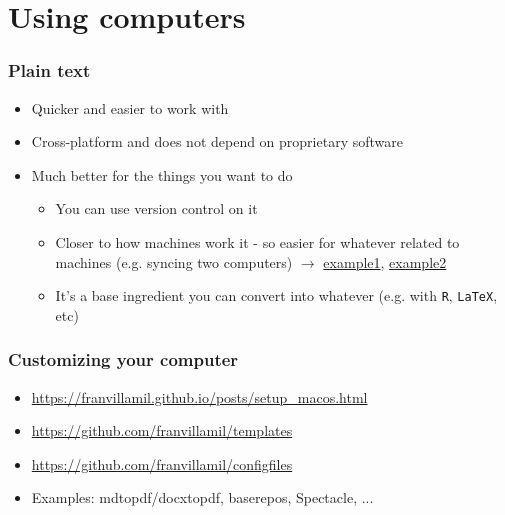 \documentclass[aspectratio=43]{beamer}
\begin{document}
\section{Using computers}

\begin{frame}
\frametitle{Plain text}
\centering

\begin{itemize}
  \item Quicker and easier to work with
  \item Cross-platform and does not depend on proprietary software
  \item Much better for the things you want to do
  \begin{itemize}
    \item You can use version control on it
    \item Closer to how machines work it - so easier for whatever related to machines (e.g. syncing two computers) $\rightarrow$ \href{https://github.com/franvillamil/configfiles}{example1}, \href{https://github.com/franvillamil/sublime_settings}{example2}
    \item It's a base ingredient you can convert into whatever (e.g. with \texttt{R}, \texttt{LaTeX}, etc)
  \end{itemize}
\end{itemize}

\end{frame}

\begin{frame}
\frametitle{Customizing your computer}
\centering

\begin{itemize}
  \item \href{https://franvillamil.github.io/posts/setup_macos.html}{https://franvillamil.github.io/posts/setup\_macos.html}
  \item \href{https://github.com/franvillamil/templates}{https://github.com/franvillamil/templates}
  \item \href{https://github.com/franvillamil/configfiles}{https://github.com/franvillamil/configfiles}
  \item Examples: mdtopdf/docxtopdf, baserepos, Spectacle, ...
\end{itemize}

\end{frame}
\end{document}
